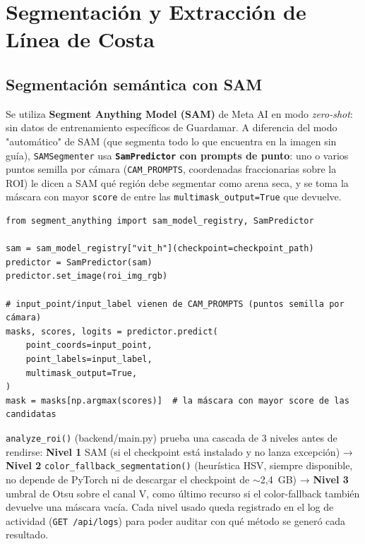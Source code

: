 \chapter{Segmentación y Extracción de Línea de Costa}
\label{ch:segmentation}

\section{Segmentación semántica con SAM}

Se utiliza \textbf{Segment Anything Model (SAM)} de Meta AI en modo \textit{zero-shot}:
sin datos de entrenamiento específicos de Guardamar. A diferencia del modo "automático" de
SAM (que segmenta todo lo que encuentra en la imagen sin guía), \texttt{SAMSegmenter} usa
\textbf{\texttt{SamPredictor} con prompts de punto}: uno o varios puntos semilla por cámara
(\texttt{CAM\_PROMPTS}, coordenadas fraccionarias sobre la ROI) le dicen a SAM qué región debe
segmentar como arena seca, y se toma la máscara con mayor \texttt{score} de entre las
\texttt{multimask\_output=True} que devuelve.

\begin{codebox}
\begin{verbatim}
from segment_anything import sam_model_registry, SamPredictor

sam = sam_model_registry["vit_h"](checkpoint=checkpoint_path)
predictor = SamPredictor(sam)
predictor.set_image(roi_img_rgb)

# input_point/input_label vienen de CAM_PROMPTS (puntos semilla por cámara)
masks, scores, logits = predictor.predict(
    point_coords=input_point,
    point_labels=input_label,
    multimask_output=True,
)
mask = masks[np.argmax(scores)]  # la máscara con mayor score de las candidatas
\end{verbatim}
\end{codebox}

\begin{infobox}
\texttt{analyze\_roi()} (backend/main.py) prueba una cascada de 3 niveles antes de rendirse:
\textbf{Nivel 1} SAM (si el checkpoint está instalado y no lanza excepción) →
\textbf{Nivel 2} \texttt{color\_fallback\_segmentation()} (heurística HSV, siempre disponible,
no depende de PyTorch ni de descargar el checkpoint de $\sim$2,4~GB) →
\textbf{Nivel 3} umbral de Otsu sobre el canal V, como último recurso si el color-fallback
también devuelve una máscara vacía. Cada nivel usado queda registrado en el log de actividad
(\texttt{GET /api/logs}) para poder auditar con qué método se generó cada resultado.
\end{infobox}

